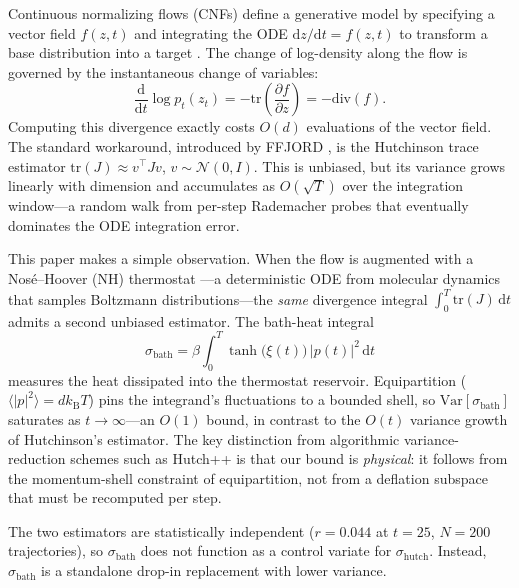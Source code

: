 \documentclass[11pt]{article}
\newcommand{\Var}{\mathrm{Var}}
\newcommand{\tr}{\mathrm{tr}}
\newcommand{\divergence}{\mathrm{div}}
\newcommand{\dd}{\mathrm{d}}
\newcommand{\kT}{k_{\mathrm{B}}T}
\newcommand{\sbath}{\sigma_{\mathrm{bath}}}
\newcommand{\shutch}{\sigma_{\mathrm{hutch}}}
\begin{document}
Continuous normalizing flows (CNFs) define a generative model by specifying a
vector field $f(z, t)$ and integrating the ODE $\dd z/\dd t = f(z, t)$ to
transform a base distribution into a target \citep{chen2018neural}. The change
of log-density along the flow is governed by the instantaneous change of
variables:
\begin{equation}
  \frac{\dd}{\dd t} \log p_t(z_t) = -\tr\!\left(\frac{\partial f}{\partial z}\right)
  = -\divergence(f).
  \label{eq:instantaneous_cov}
\end{equation}
Computing this divergence exactly costs $O(d)$ evaluations of the vector field.
The standard workaround, introduced by FFJORD \citep{grathwohl2019ffjord}, is
the Hutchinson trace estimator $\tr(J) \approx v^\top J v$, $v \sim
\mathcal{N}(0, I)$. This is unbiased, but its variance grows linearly with
dimension and accumulates as $O(\sqrt{T})$ over the integration window---a
random walk from per-step Rademacher probes that eventually dominates the ODE
integration error.

This paper makes a simple observation. When the flow is augmented with a
Nos\'{e}--Hoover (NH) thermostat \citep{nose1984unified, hoover1985canonical}
---a deterministic ODE from molecular dynamics that samples Boltzmann
distributions---the \emph{same} divergence integral $\int_0^T \tr(J)\,\dd t$
admits a second unbiased estimator. The bath-heat integral
\begin{equation}
  \sbath = \beta \int_0^T \tanh\bigl(\xi(t)\bigr)\,|p(t)|^2\,\dd t
  \label{eq:sigma_bath_intro}
\end{equation}
measures the heat dissipated into the thermostat reservoir. Equipartition
($\langle |p|^2 \rangle = d\kT$) pins the integrand's fluctuations to a
bounded shell, so $\Var[\sbath]$ saturates as $t \to \infty$---an $O(1)$
bound, in contrast to the $O(t)$ variance growth of Hutchinson's estimator.
The key distinction from algorithmic variance-reduction schemes such as
Hutch++ \citep{liu2025hutch} is that our bound is \emph{physical}: it follows
from the momentum-shell constraint of equipartition, not from a deflation
subspace that must be recomputed per step.

The two estimators are statistically independent ($r = 0.044$ at $t{=}25$,
$N{=}200$ trajectories), so $\sbath$ does not function as a control variate
for $\shutch$. Instead, $\sbath$ is a standalone drop-in replacement with
lower variance.
\end{document}
